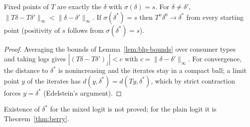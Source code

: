 \begin{theorem}
\label{thm:blp-contraction}
\leanok
{}
Fixed points of $T$ are exactly the $\delta$ with $\sigma(\delta) = s$. For $\delta\ne\delta'$,
$\|T\delta - T\delta'\|_\infty < \|\delta-\delta'\|_\infty$. If $\sigma(\delta^*) = s$ then $T^n\delta^0\to\delta^*$ from
every starting point (positivity of $s$ follows from $\sigma(\delta^*) = s$).
\end{theorem}
\begin{proof}
\leanok
Averaging the bounds of Lemma~\ref{lem:blp-bounds} over consumer types and taking logs gives
$|(T\delta-T\delta')_j| < c$ with $c = \|\delta-\delta'\|_\infty$. For convergence, the distance to $\delta^*$ is
nonincreasing and the iterates stay in a compact ball; a limit point $y$ of the iterates has $d(y,\delta^*) =
d(Ty,\delta^*)$, which by strict contraction forces $y = \delta^*$ (Edelstein's argument).
\end{proof}

Existence of $\delta^*$ for the mixed logit is not proved; for the plain logit it is Theorem~\ref{thm:berry}.
